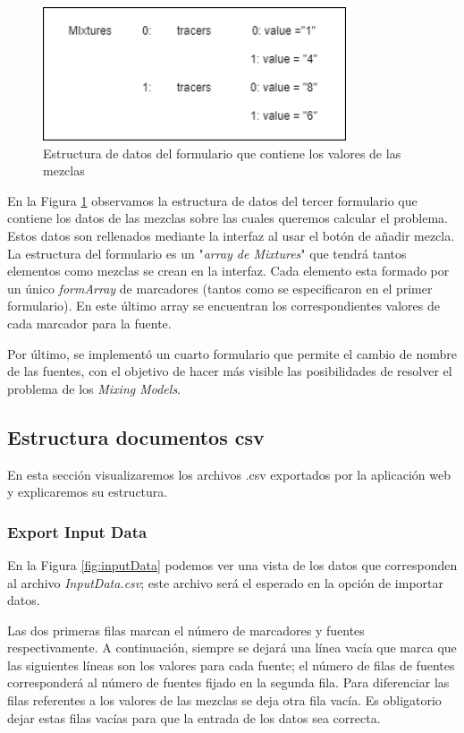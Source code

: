 \begin{figure}[h!] 
\centering
    \includegraphics[width=0.8\textwidth]{img/formMixtures.png}
\caption{Estructura de datos del formulario que contiene los valores de las mezclas}
\label{fig:formMixtures}
\end{figure}

En la Figura \ref{fig:formMixtures}  observamos la estructura de datos del tercer formulario que contiene los datos de las mezclas sobre las cuales queremos calcular el problema. Estos datos son rellenados mediante la interfaz al usar el botón de añadir mezcla. La estructura del formulario es un "\textit{array de Mixtures}"  que tendrá tantos elementos como mezclas se crean en la interfaz. Cada elemento esta formado por un único \textit{formArray} de marcadores (tantos como se especificaron en el primer formulario). En este último array se encuentran los correspondientes valores de cada marcador para la fuente.

Por último, se implementó un cuarto formulario que permite  el cambio de nombre de las fuentes, con el objetivo de hacer más visible las posibilidades de resolver el problema de los \textit{Mixing Models}.

\subsection{Estructura documentos csv}

En esta sección visualizaremos los archivos .csv exportados por la aplicación web y  explicaremos su estructura.

\subsubsection{Export Input Data}

En la Figura \ref{fig:inputData} podemos ver una vista de los datos que corresponden al archivo \textit{InputData.csv}; este archivo será el esperado en la opción de importar datos.

Las dos primeras filas marcan el número de marcadores y fuentes  respectivamente. A continuación, siempre se dejará una línea vacía que marca que las siguientes líneas son los valores para cada fuente; el número de filas de fuentes corresponderá al número de fuentes fijado en la segunda fila. Para diferenciar las filas referentes a los valores de las mezclas  se deja otra fila vacía. Es obligatorio dejar estas filas vacías para que la entrada de los datos sea correcta.

